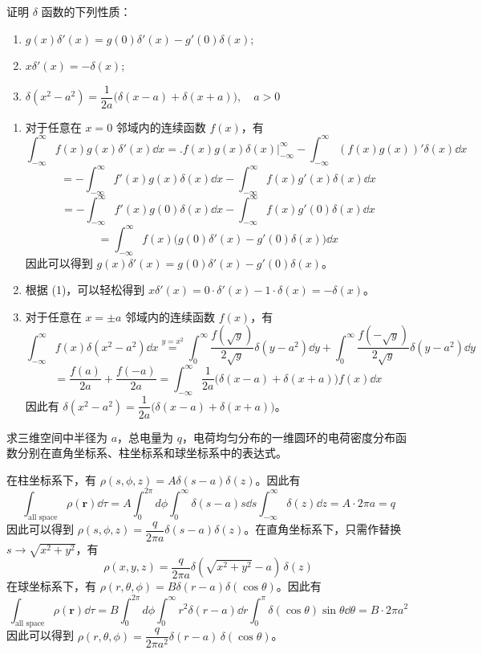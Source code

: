 
\begin{question}
证明 \(\delta\) 函数的下列性质：
\begin{enumerate}
  \item \(g(x) \delta'(x)=g(0)\delta'(x)-g'(0)\delta(x)\);
  \item \(x \delta'(x)=-\delta(x)\);
  \item \(\delta(x^2-a^2)=\dfrac1{2a}\bigl(\delta(x-a)+\delta(x+a)\bigr),\quad a>0\)
\end{enumerate}
\begin{solution}
\begin{enumerate}
  \item 对于任意在 \(x=0\) 邻域内的连续函数 \(f(x)\)，有 \[ \int_{-\infty}^\infty f(x) g(x) \delta'(x)\dd{x} =\bigl.f(x)g(x)\delta(x)\bigr|_{-\infty}^\infty-\int_{-\infty}^\infty (f(x)g(x))' \delta(x)\dd{x} \] \[ =-\int_{-\infty}^\infty f'(x) g(x) \delta(x)\dd{x} - \int_{-\infty}^\infty f(x) g'(x) \delta(x)\dd{x} \] \[ =-\int_{-\infty}^{\infty} f'(x) g(0) \delta(x)\dd{x}-\int_{-\infty}^\infty f(x) g'(0) \delta(x)\dd{x} \] \[ =\int_{-\infty}^\infty f(x) \bigl(g(0) \delta'(x) - g'(0) \delta(x)\bigr)\dd{x} \]因此可以得到 \(g(x) \delta'(x)=g(0) \delta'(x)-g'(0)\delta(x)\)。
  \item 根据 (1)，可以轻松得到 \(x \delta'(x)=0\cdot\delta'(x)-1\cdot\delta(x)=-\delta(x)\)。
  \item 对于任意在 \(x=\pm a\) 邻域内的连续函数 \(f(x)\)，有 \[ \int_{-\infty}^\infty f(x) \delta(x^2-a^2)\dd{x} \overset{y=x^2}{=} \int_0^\infty \frac{f(\sqrt{y})}{2\sqrt{y}} \delta(y-a^2)\dd{y} + \int_0^{\infty} \frac{f(-\sqrt{y})}{2\sqrt{y}} \delta(y-a^2)\dd{y} \] \[ =\frac{f(a)}{2a}+\frac{f(-a)}{2a}=\int_{-\infty}^\infty \frac1{2a}\bigl(\delta(x-a)+\delta(x+a)\bigr) f(x)\dd{x} \]因此有 \(\delta(x^2-a^2)=\dfrac1{2a}\bigl(\delta(x-a)+\delta(x+a)\bigr)\)。
\end{enumerate}
\end{solution}
\end{question}

\begin{question}
求三维空间中半径为 \(a\)，总电量为 \(q\)，电荷均匀分布的一维圆环的电荷密度分布函数分别在直角坐标系、柱坐标系和球坐标系中的表达式。
\begin{solution}
在柱坐标系下，有 \(\rho(s,\phi,z)=A\delta(s-a)\delta(z)\)。因此有 \[ \int_{\text{all space}} \rho(\bm{r})\dd{\tau} = A\int_0^{2\pi} d\phi \int_0^\infty \delta(s-a)s\dd{s} \int_{-\infty}^\infty \delta(z)\dd{z} = A\cdot 2\pi a = q \]因此可以得到 \(\rho(s,\phi,z)=\dfrac{q}{2\pi a} \delta(s-a)\delta(z)\)。在直角坐标系下，只需作替换 \(s\to\sqrt{x^2+y^2}\)，有 \[ \rho(x,y,z)=\frac{q}{2\pi a} \delta(\sqrt{x^2+y^2}-a)\,\delta(z) \]在球坐标系下，有 \(\rho(r,\theta,\phi)=B\delta(r-a)\delta(\cos\theta)\)。因此有 \[ \int_{\text{all space}} \rho(\bm{r})\dd{\tau} = B\int_0^{2\pi} d\phi \int_0^{\infty} r^2\delta(r-a)\dd{r} \int_0^\pi \delta(\cos\theta)\sin\theta\dd{\theta} = B\cdot 2\pi a^2 \]因此可以得到 \(\rho(r,\theta,\phi)=\dfrac{q}{2\pi a^2} \delta(r-a)\,\delta(\cos\theta)\)。
\end{solution}
\end{question}

